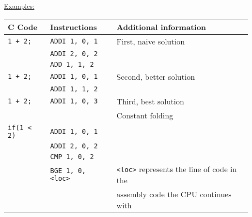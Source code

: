\par{
    \noindent
    \underline{Examples:}
    \par{
        \noindent
        \begin{tabular}{lll}
            \hline
            C Code                  &   Instructions                &    Additional information                             \\
            \hline
            \hline
            \rowcolor{blue!25}                
            \texttt{1 + 2;}         &   \texttt{ADDI 1, 0, 1}       &   First, naive solution                               \\
            \rowcolor{blue!25}
                                    &   \texttt{ADDI 2, 0, 2}       &                                                       \\
            \rowcolor{blue!25}
                                    &   \texttt{ADD 1, 1, 2}        &                                                       \\
            \rowcolor{green!25}
            \texttt{1 + 2;}         &   \texttt{ADDI 1, 0, 1}       &   Second, better solution                             \\
            \rowcolor{green!25}
                                    &   \texttt{ADDI 1, 1, 2}       &                                                       \\
            \rowcolor{red!25}
            \texttt{1 + 2;}         &   \texttt{ADDI 1, 0, 3}       &   Third, best solution                                \\
            \rowcolor{red!25}
                                    &                               &   Constant folding                                    \\   
            \hline
            \texttt{if(1 < 2)}      &   \texttt{ADDI 1, 0, 1}       &                                                       \\
                                    &   \texttt{ADDI 2, 0, 2}       &                                                       \\
                                    &   \texttt{CMP 1, 0, 2}        &                                                       \\
                                    &   \texttt{BGE 1, 0, <loc>}    &  \texttt{<loc>} represents the line of code in the    \\
                                    &                               &   assembly code the CPU continues with                \\
            \hline
        \end{tabular}
    }    
}

